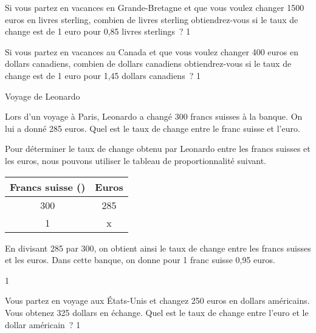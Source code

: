 \documentclass[a4paper,11pt]{report}
\begin{document}
\begin{exo} %
{Si vous partez en vacances en Grande-Bretagne et que vous voulez changer 1500 euros en livres sterling, combien de livres sterling obtiendrez-vous si le taux de change est de 1 euro pour 0,85 livres sterlings~?
\vspace{-0.1cm}
}{1}
\end{exo}

\begin{exo} %
{Si vous partez en vacances au Canada et que vous voulez changer 400 euros en dollars canadiens, combien de dollars canadiens obtiendrez-vous si le taux de change est de  1 euro pour 1,45 dollars canadiens~?
	\vspace{-0.3cm}
}{1}
\end{exo}

\begin{resolu}
{Voyage de Leonardo}{Lors d'un voyage à Paris, Leonardo a changé 300 francs suisses à la banque. On lui a donné 285 euros. Quel est le taux de change entre le franc suisse et l'euro.

{\color{blue}Pour déterminer le taux de change obtenu par Leonardo entre les francs suisses et les euros, nous pouvons utiliser le tableau de proportionnalité suivant.

\begin{center}
\begin{tabular}{|c|c|}
\hline
Francs suisse (\tunit{}{\fr}) & Euros  \\ \hline
300 & 285 \\ \hline
1 & x \\ \hline
\end{tabular}
\end{center}

En divisant 285 par 300, on obtient ainsi le taux de change entre les francs suisses et les euros. Dans cette banque, on donne pour 1 franc suisse 0,95 euros. 
\vspace{-0.2cm}
}


}{1}
\end{resolu}



\begin{exo} %
{Vous partez en voyage aux États-Unis et changez 250 euros en dollars américains. Vous obtenez 325 dollars en échange. Quel est le taux de change entre l'euro et le dollar américain~?
\vspace{-0.3cm}
}{1}
\end{exo}
\end{document}
